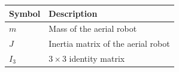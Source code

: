 \begin{table}[h!]
\centering
\begin{tabular}{p{3cm} p{11cm}}
\hline
\textbf{Symbol} & \textbf{Description} \\
\hline

$m$ & Mass of the aerial robot \\
$J$ & Inertia matrix of the aerial robot \\
$I_3$ & $3 \times 3$ identity matrix \\



\hline
\end{tabular}
\end{table}